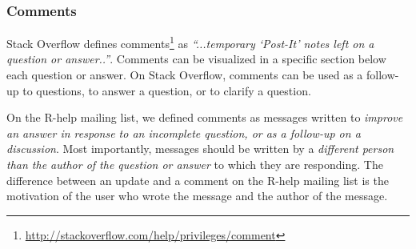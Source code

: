 \documentclass{sig-alternate-05-2015}
\begin{document}



\subsubsection{Comments}
	Stack Overflow defines comments\footnote{\url{http://stackoverflow.com/help/privileges/comment}} as \textit{``...temporary `Post-It' notes left on a question or answer..''}.
	Comments can be visualized in a specific section below each question or answer.
	On Stack Overflow, comments can be used as a follow-up to questions, to answer a question, or to clarify a question.

	On the R-help mailing list, we defined comments as messages written to \emph{improve an answer in response to an incomplete question, or as a follow-up on a discussion}.
	Most importantly, messages should be written by a \emph{different person than the author of the question or answer} to which they are responding.
	The difference between an update and a comment on the R-help mailing list is the motivation of the user who wrote the message and the author of the message.
\end{document}
